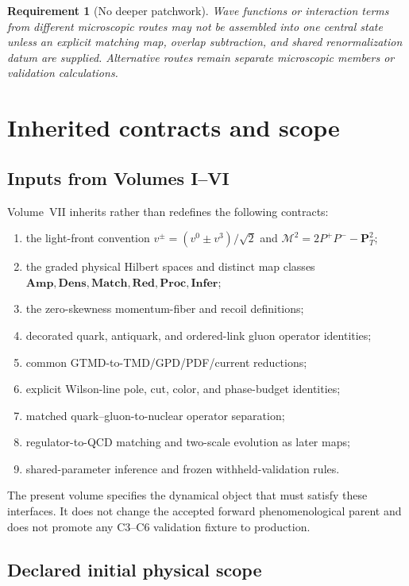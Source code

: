 \documentclass[11pt]{article}
\newtheorem{requirement}[definition]{Requirement}
\newcommand{\Amp}{\mathbf{Amp}}
\newcommand{\Dens}{\mathbf{Dens}}
\newcommand{\Match}{\mathbf{Match}}
\newcommand{\Red}{\mathbf{Red}}
\newcommand{\Proc}{\mathbf{Proc}}
\newcommand{\Infer}{\mathbf{Infer}}
\newcommand{\cM}{\mathcal M}
\begin{document}
\begin{requirement}[No deeper patchwork]
Wave functions or interaction terms from different microscopic routes may not
be assembled into one central state unless an explicit matching map, overlap
subtraction, and shared renormalization datum are supplied.  Alternative routes
remain separate microscopic members or validation calculations.
\label{req:no-deeper-patchwork}
\end{requirement}

\section{Inherited contracts and scope}
\label{sec:scope}

\subsection{Inputs from Volumes I--VI}

Volume~VII inherits rather than redefines the following contracts:
\begin{enumerate}
 \item the light-front convention
 \(v^{\pm}=(v^0\pm v^3)/\sqrt2\) and
 \(\cM^2=2P^+P^- -\bm P_T^2\);
 \item the graded physical Hilbert spaces and distinct map classes
 \(\Amp,\Dens,\Match,\Red,\Proc,\Infer\);
 \item the zero-skewness momentum-fiber and recoil definitions;
 \item decorated quark, antiquark, and ordered-link gluon operator identities;
 \item common GTMD-to-TMD/GPD/PDF/current reductions;
 \item explicit Wilson-line pole, cut, color, and phase-budget identities;
 \item matched quark--gluon-to-nuclear operator separation;
 \item regulator-to-QCD matching and two-scale evolution as later maps;
 \item shared-parameter inference and frozen withheld-validation rules.
\end{enumerate}

The present volume specifies the dynamical object that must satisfy these
interfaces.  It does not change the accepted forward phenomenological parent
and does not promote any C3--C6 validation fixture to production.

\subsection{Declared initial physical scope}
\end{document}
